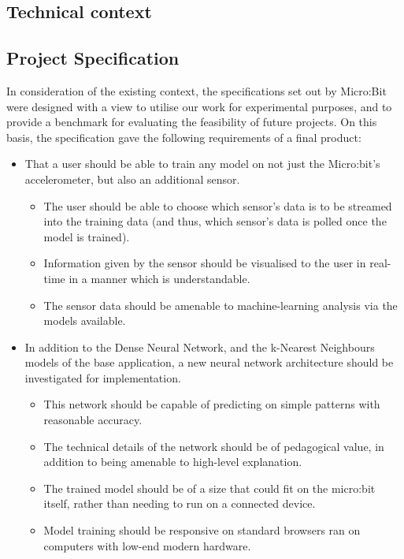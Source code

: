 \documentclass{article}
\begin{document}
\subsection{Technical context}%
\label{subsec:context}


\subsection{Project Specification}%
\label{subsec:spec}

In consideration of the existing context, the specifications set out by Micro:Bit were designed with a view to utilise our work for experimental purposes, and to provide a benchmark for evaluating the feasibility of future projects. On this basis, the specification gave the following requirements of a final product:
\begin{itemize}
  \item That a user should be able to train any model on not just the Micro:bit's accelerometer, but also an additional sensor.
        \begin{itemize}
                \item The user should be able to choose which sensor's data is to be streamed into the training data (and thus, which sensor's data is polled once the model is trained).
                \item Information given by the sensor should be visualised to the user in real-time in a manner which is understandable.
                \item The sensor data should be amenable to machine-learning analysis via the models available.
        \end{itemize}
  \item In addition to the Dense Neural Network, and the k-Nearest Neighbours models of the base application, a new neural network architecture should be investigated for implementation.
        \begin{itemize}
                \item This network should be capable of predicting on simple patterns with reasonable accuracy.
                \item The technical details of the network should be of pedagogical value, in addition to being amenable to high-level explanation.
                \item The trained model should be of a size that could fit on the micro:bit itself, rather than needing to run on a connected device.
                \item Model training should be responsive on standard browsers ran on computers with low-end modern hardware.
        \end{itemize}
\end{itemize}
\end{document}
